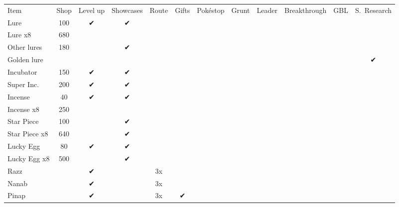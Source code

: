 \begin{table}
\centering
\begin{tabular}{p{}ccccccccccc}
Item              & Shop & Level up
                             & Showcases
                                         & Route
                                              & Gifts
                                                  & Pokéstop
                                                        & Grunt
                                                              & Leader
                                                                    & Breakthrough
                                                                        & GBL
                                                                            & S.\ Research \\
\Midrule
Lure              & 100  & ✔ & ✔         &    &    &     &     &     &   &   &   \\
Lure x8           & 680  &   &           &    &    &     &     &     &   &   &   \\
Other lures       & 180  &   & ✔         &    &    &     &     &     &   &   &   \\
Golden lure       &      &   &           &    &    &     &     &     &   &   & ✔ \\
Incubator         & 150  & ✔ & ✔         &    &    &     &     &     &   &   &   \\
Super Inc.        & 200  & ✔ & ✔         &    &    &     &     &     &   &   &   \\
Incense           & 40   & ✔ & ✔         &    &    &     &     &     &   &   &   \\
Incense x8        & 250  &   &           &    &    &     &     &     &   &   &   \\
Star Piece        & 100  &   & ✔         &    &    &     &     &     &   &   &   \\
Star Piece x8     & 640  &   & ✔         &    &    &     &     &     &   &   &   \\
Lucky Egg         & 80   & ✔ & ✔         &    &    &     &     &     &   &   &   \\
Lucky Egg x8      & 500  &   & ✔         &    &    &     &     &     &   &   &   \\
Razz              &      & ✔ &           & 3x &    &     &     &     &   &   &   \\
Nanab             &      & ✔ &           & 3x &    &     &     &     &   &   &   \\
Pinap             &      & ✔ &           & 3x &  ✔ &     &     &     &   &   &   \\

\end{tabular}
\end{table}

